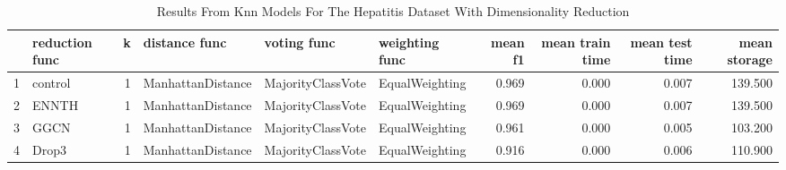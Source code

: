 \begin{table}
\centering
\caption{Results From Knn Models For The Hepatitis Dataset With Dimensionality Reduction}
\label{tab:knn_reduction_results_hepatitis}
\begin{tabular}{rlrlllrrrr}
\toprule
 & reduction func & k & distance func & voting func & weighting func & mean f1 & mean train time & mean test time & mean storage \\
\midrule
1 & control & 1 & ManhattanDistance & MajorityClassVote & EqualWeighting & 0.969 & 0.000 & 0.007 & 139.500 \\
2 & ENNTH & 1 & ManhattanDistance & MajorityClassVote & EqualWeighting & 0.969 & 0.000 & 0.007 & 139.500 \\
3 & GGCN & 1 & ManhattanDistance & MajorityClassVote & EqualWeighting & 0.961 & 0.000 & 0.005 & 103.200 \\
4 & Drop3 & 1 & ManhattanDistance & MajorityClassVote & EqualWeighting & 0.916 & 0.000 & 0.006 & 110.900 \\
\bottomrule
\end{tabular}
\end{table}
